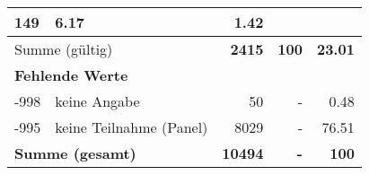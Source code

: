 \begin{longtable}{lXrrr}
       \num{149} &
       \num[round-mode=places,round-precision=2]{6.17} &
         \num[round-mode=places,round-precision=2]{1.42} \\
     \midrule
     \multicolumn{2}{l}{Summe (gültig)} &
       \textbf{\num{2415}} &
     \textbf{\num{100}} &
       \textbf{\num[round-mode=places,round-precision=2]{23.01}} \\
     \multicolumn{5}{l}{\textbf{Fehlende Werte}}\\
       -998 &
       keine Angabe &
         \num{50} &
        - &
         \num[round-mode=places,round-precision=2]{0.48} \\
       -995 &
       keine Teilnahme (Panel) &
         \num{8029} &
        - &
         \num[round-mode=places,round-precision=2]{76.51} \\
     \midrule
     \multicolumn{2}{l}{\textbf{Summe (gesamt)}} &
          \textbf{\num{10494}} &
        \textbf{-} &
        \textbf{\num{100}} \\
     \bottomrule
     \end{longtable}
     
